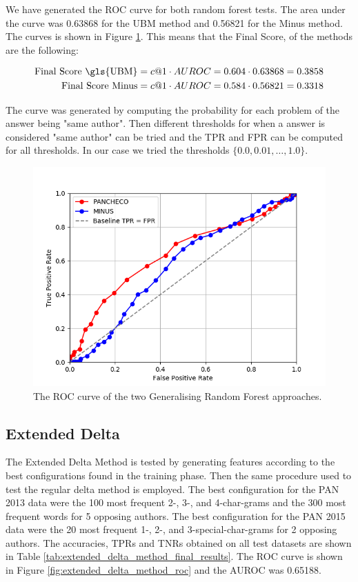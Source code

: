 We have generated the \gls{ROC} curve for both random forest tests. The area
under the curve was 0.63868 for the \gls{UBM} method and 0.56821 for the Minus
method. The curves is shown in Figure \ref{fig:forest_roc}. This means that the
Final Score, of the methods are the following:

\begin{align}
    \text{Final Score \gls{UBM}} &= c@1 \cdot AUROC = 0.604 \cdot 0.63868 = 0.3858  \\
    \text{Final Score Minus} &= c@1 \cdot AUROC = 0.584 \cdot 0.56821 = 0.3318
\end{align}

The curve was generated by computing the probability for each problem of the
answer being "same author". Then different thresholds for when a answer is
considered "same author" can be tried and the \gls{TPR} and \gls{FPR} can be
computed for all thresholds. In our case we tried the thresholds $\{0.0, 0.01,
\dots, 1.0\}$.

\begin{figure}
    \centering
    \includegraphics[width=.7\textwidth]{./pictures/forest_roc.png}
    \caption{The ROC curve of the two Generalising Random Forest
    approaches.}
    \label{fig:forest_roc}
\end{figure}

\subsection{Extended Delta} \label{subsec:results:extended_delta}
The Extended Delta Method is tested by generating features according to the best
configurations found in the training phase. Then the same procedure used to
test the regular delta method is employed. The best configuration for the PAN
2013 data were the 100 most frequent 2-, 3-, and 4-char-grams and the 300 most
frequent words for 5 opposing authors. The best configuration for the PAN 2015
data were the 20 most frequent 1-, 2-, and 3-special-char-grams for 2 opposing
authors. The accuracies, \gls{TPR}s and \gls{TNR}s obtained on all test datasets
are shown in Table \ref{tab:extended_delta_method_final_results}. The \gls{ROC}
curve is shown in Figure \ref{fig:extended_delta_method_roc} and the \gls{AUROC}
was 0.65188.

